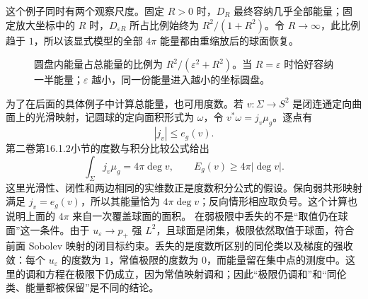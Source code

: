 这个例子同时有两个观察尺度。固定 \(R>0\) 时，\(D_R\) 最终容纳几乎全部能量；固定放大坐标中的 \(R\) 时，\(D_{\varepsilon R}\) 所占比例始终为
\(R^2/(1+R^2)\)。令 \(R\to\infty\)，此比例趋于 \(1\)，所以该显式模型的全部 \(4\pi\) 能量都由重缩放后的球面恢复。
\begin{figure}[htbp]
	\centering
	
	\caption[球面气泡的能量尺度]{圆盘内能量占总能量的比例为 \(R^2/(\varepsilon^2+R^2)\)。当 \(R=\varepsilon\) 时恰好容纳一半能量；\(\varepsilon\) 越小，同一份能量进入越小的坐标圆盘。}
	\label{g3:fig:bubble-energy-scale}
\end{figure}

为了在后面的具体例子中计算总能量，也可用度数。若
\(v:\Sigma\to S^2\) 是闭连通定向曲面上的光滑映射，记圆球的定向面积形式为 \(\omega\)，令 \(v^*\omega=j_v\mu_g\)。逐点有
\[
	|j_v|\le e_g(v).
\]
第二卷第16.1.2小节的度数与积分比较公式给出
\[
	\int_\Sigma j_v\mu_g=4\pi\deg v,\qquad
	E_g(v)\ge4\pi|\deg v|.
\]
这里光滑性、闭性和两边相同的实维数正是度数积分公式的假设。保向弱共形映射满足 \(j_v=e_g(v)\)，所以其能量恰为 \(4\pi\deg v\)；反向情形相应取负号。这个计算也说明上面的 \(4\pi\) 来自一次覆盖球面的面积。
\ProseParagraphBreak
在弱极限中丢失的不是“取值仍在球面”这一条件。由于
\(u_\varepsilon\to p_+\) 强 \(L^2\)，且球面是闭集，极限依然取值于球面，符合前面 Sobolev 映射的闭目标约束。丢失的是度数所区别的同伦类以及梯度的强收敛：每个 \(u_\varepsilon\) 的度数为 \(1\)，常值极限的度数为 \(0\)，而能量留在集中点的测度中。这里的调和方程在极限下仍成立，因为常值映射调和；因此“极限仍调和”和“同伦类、能量都被保留”是不同的结论。
